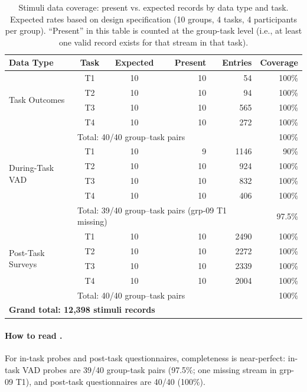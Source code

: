 \documentclass[11pt,a4paper]{article}
\begin{document}
\begin{table}[htb]
  \centering
  \caption{Stimuli data coverage: present vs. expected records by data type and task.
    Expected rates based on design specification (10 groups, 4 tasks, 4 participants per group).
    ``Present'' in this table is counted at the group-task level (i.e., at least one
    valid record exists for that stream in that task).}
  \label{tab:coverage}
  \small
  \begin{tabular}{lccrrr}
    \toprule
    Data Type & Task & Expected & Present & Entries & Coverage \\
    \midrule
    \multirow{4}{*}{Task Outcomes} & T1 & 10 & 10 & 54 & 100\% \\
    & T2 & 10 & 10 & 94 & 100\% \\
    & T3 & 10 & 10 & 565 & 100\% \\
    & T4 & 10 & 10 & 272 & 100\% \\
    & \multicolumn{4}{l}{Total: 40/40 group–task pairs} & 100\% \\[3pt]
    \multirow{4}{*}{During-Task VAD} & T1 & 10 & 9 & 1146 & 90\% \\
    & T2 & 10 & 10 & 924 & 100\% \\
    & T3 & 10 & 10 & 832 & 100\% \\
    & T4 & 10 & 10 & 406 & 100\% \\
    & \multicolumn{4}{l}{Total: 39/40 group–task pairs (grp-09 T1 missing)} & 97.5\% \\[3pt]
    \multirow{4}{*}{Post-Task Surveys} & T1 & 10 & 10 & 2490 & 100\% \\
    & T2 & 10 & 10 & 2272 & 100\% \\
    & T3 & 10 & 10 & 2339 & 100\% \\
    & T4 & 10 & 10 & 2004 & 100\% \\
    & \multicolumn{4}{l}{Total: 40/40 group–task pairs} & 100\% \\[3pt]
    \multicolumn{5}{l}{\textbf{Grand total: 12,398 stimuli records}} \\
    \bottomrule
  \end{tabular}
\end{table}

\paragraph{How to read .}
For in-task probes and post-task questionnaires, completeness is near-perfect:
in-task VAD probes are 39/40 group-task pairs (97.5\%; one missing stream in grp-09 T1),
and post-task questionnaires are 40/40 (100\%).
\end{document}
